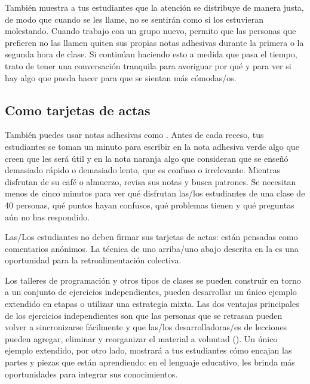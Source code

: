 También muestra a tus estudiantes que la atención se distribuye de manera justa,
de modo que cuando se les llame,
no se sentirán como si los estuvieran molestando.
Cuando trabajo con un grupo nuevo,
permito que las personas que prefieren no las llamen quiten sus propias notas adhesivas
durante la primera o la segunda hora de clase.
Si continúan haciendo esto a medida que pasa el tiempo,
trato de tener una conversación tranquila para averiguar por qué
y para ver si hay algo que pueda hacer para que se sientan más cómodas/os.

\subsection*{Como tarjetas de actas}

También puedes usar notas adhesivas como .
Antes de cada receso,
tus estudiantes se toman un minuto para escribir en la nota adhesiva verde
algo que creen que les será útil
y en la nota naranja
algo que consideran que se enseñó demasiado rápido o demasiado lento,
que es confuso
o irrelevante.
Mientras disfrutan de su café o almuerzo,
revisa sus notas y busca patrones.
Se necesitan menos de cinco minutos para ver qué disfrutan las/los estudiantes de una clase de 40 personas,
qué puntos hayan confusos,
qué problemas tienen
y qué preguntas aún no has respondido.

Las/Los estudiantes no deben firmar sus tarjetas de actas:
están pensadas como comentarios anónimos.
La técnica de uno arriba/uno abajo descrita en la 
es una oportunidad para la retroalimentación colectiva.


Los talleres de programación y otros tipos de clases
se pueden construir en torno a un conjunto de ejercicios independientes,
pueden desarrollar un único ejemplo extendido en etapas
o utilizar una estrategia mixta.
Las dos ventajas principales de los ejercicios independientes son que
las personas que se retrasan pueden volver a sincronizarse fácilmente
y que las/los desarrolladoras/es de lecciones pueden agregar, eliminar y reorganizar el material a voluntad
().
Un único ejemplo extendido,
por otro lado,
mostrará a tus estudiantes cómo encajan las partes y piezas que están aprendiendo:
en el lenguaje educativo,
les brinda más oportunidades para integrar sus conocimientos.

